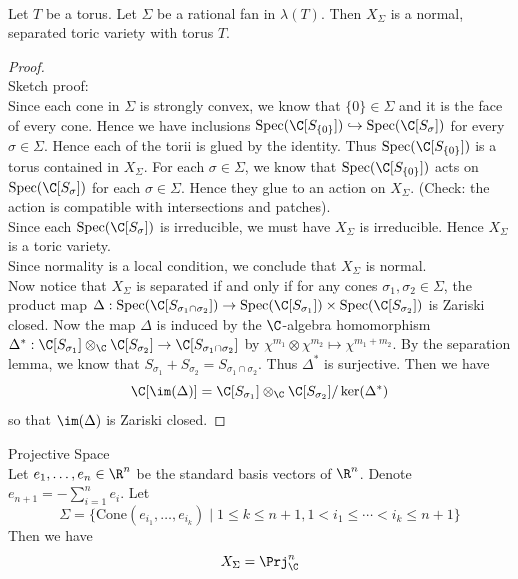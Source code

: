 \documentclass[a4paper]{article}
\begin{document}
\begin{prp}{}{}\\
Let $T$ be a torus. Let $\Sigma$ be a rational fan in $\lambda(T)$. Then $X_\Sigma$ is a normal, separated toric variety with torus $T$. 
\begin{proof}\\
Sketch proof: \\

Since each cone in $\Sigma$ is strongly convex, we know that $\{0\}\in\Sigma$ and it is the face of every cone. Hence we have inclusions $\text{Spec}(\C[S_{\{0\}}])\hookrightarrow\text{Spec}(\C[S_\sigma])$ for every $\sigma\in\Sigma$. Hence each of the torii is glued by the identity. Thus $\text{Spec}(\C[S_{\{0\}}])$ is a torus contained in $X_\Sigma$. For each $\sigma\in\Sigma$, we know that $\text{Spec}(\C[S_{\{0\}}])$ acts on $\text{Spec}(\C[S_\sigma])$ for each $\sigma\in\Sigma$. Hence they glue to an action on $X_\Sigma$. (Check: the action is compatible with intersections and patches). \\

Since each $\text{Spec}(\C[S_\sigma])$ is irreducible, we must have $X_\Sigma$ is irreducible. Hence $X_\Sigma$ is a toric variety. \\

Since normality is a local condition, we conclude that $X_\Sigma$ is normal. \\

Now notice that $X_\Sigma$ is separated if and only if for any cones $\sigma_1,\sigma_2\in\Sigma$, the product map $\Delta:\text{Spec}(\C[S_{\sigma_1\cap\sigma_2}])\to\text{Spec}(\C[S_{\sigma_1}])\times\text{Spec}(\C[S_{\sigma_2}])$ is Zariski closed. Now the map $\Delta$ is induced by the $\C$-algebra homomorphism $\Delta^\ast:\C[S_{\sigma_1}]\otimes_\C\C[S_{\sigma_2}]\to\C[S_{\sigma_1\cap\sigma_2}]$ by $\chi^{m_1}\otimes\chi^{m_2}\mapsto\chi^{m_1+m_2}$. By the separation lemma, we know that $S_{\sigma_1}+S_{\sigma_2}=S_{\sigma_1\cap\sigma_2}$. Thus $\Delta^\ast$ is surjective. Then we have $$\C[\im(\Delta)]=\C[S_{\sigma_1}]\otimes_\C\C[S_{\sigma_2}]/\ker(\Delta^\ast)$$ so that $\im(\Delta)$ is Zariski closed. 
\end{proof}
\end{prp}

\begin{eg}{Projective Space}{}\\
Let $e_1,\dots,e_n\in\R^n$ be the standard basis vectors of $\R^n$. Denote $e_{n+1}=-\sum_{i=1}^ne_i$. Let $$\Sigma=\{\text{Cone}(e_{i_1},\dots,e_{i_k})\;|\;1\leq k\leq n+1,1<i_1\leq\cdots<i_k\leq n+1\}$$ Then we have $$X_\Sigma=\Prj_\C^n$$
\end{eg}
\end{document}
